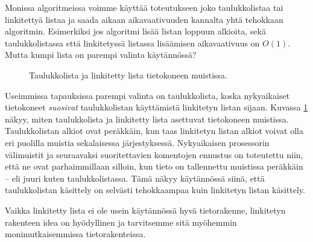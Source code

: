 Monissa algoritmeissa voimme käyttää toteutukseen joko
taulukkolistaa tai linkitettyä listaa ja saada aikaan
aikavaativuuden kannalta yhtä tehokkaan algoritmin.
Esimerkiksi jos algoritmi lisää listan loppuun alkioita,
sekä taulukkolistassa että linkitetyssä listassa
lisäämisen aikavaativuus on $O(1)$.
Mutta kumpi lista on parempi valinta käytännössä?

\begin{figure}
\center
{}
\caption{Taulukkolista ja linkitetty lista tietokoneen muistissa.}
\label{fig:taulin}
\end{figure}

Useimmissa tapauksissa parempi valinta on taulukkolista,
koska nykyaikaiset tietokoneet
\emph{suosivat} taulukkolistan käyttämistä linkitetyn listan sijaan.
Kuvassa \ref{fig:taulin} näkyy, miten taulukkolista ja linkitetty lista
asettuvat tietokoneen muistissa.
Taulukkolistan alkiot ovat peräkkäin, kun taas linkitetyn
listan alkiot voivat olla eri puolilla muistia sekalaisessa
järjestyksessä.
Nykyaikaisen prosessorin välimuistit ja seuraavaksi suoritettavien
komentojen ennustus
on toteutettu niin, että ne ovat parhaimmillaan silloin,
kun tieto on tallennettu muistissa peräkkäin -- eli juuri kuten
taulukkolistassa.
Tämä näkyy käytännössä siinä, että taulukkolistan käsittely on selvästi
tehokkaampaa kuin linkitetyn listan käsittely.

Vaikka linkitetty lista ei ole usein käytännössä hyvä tietorakenne,
linkitetyn rakenteen idea on hyödyllinen
ja tarvitsemme sitä myöhemmin monimutkaisemmissa tietorakenteissa.
